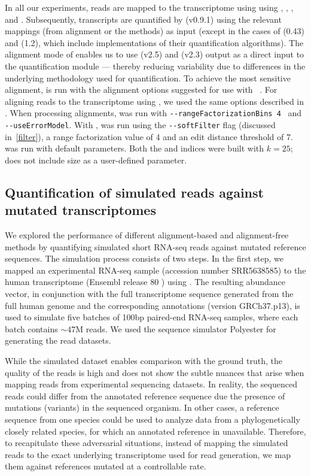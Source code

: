 In all our experiments, reads are mapped to the transcriptome using using \bt, \kallisto, \hera, \sla and \STAR. 
Subsequently, transcripts are quantified by \salmon(v0.9.1) using the relevant mappings (from alignment or the 
\nab methods) as input (except in the cases of \kallisto(0.43) and \hera(1.2), which include implementations of 
their quantification algorithms). The alignment mode of \salmon enables us to use \STAR(v2.5) and \bt(v2.3) output 
as a direct input to the quantification module --- thereby reducing variability due to differences in the 
underlying methodology used for quantification. To achieve the most sensitive alignment, \bt is run with the 
alignment options suggested for use with \rsem~\citep{rsembmc}. For aligning reads to the transcriptome using 
\STAR, we used the same options described in \citep{Srivastava2016rapmap}. When processing alignments, \salmon 
was run with \texttt{-{}-rangeFactorizationBins 4}~\citep{ismb2017factorization} and \texttt{-{}-useErrorModel}. 
With \sla, \salmon was run using the \texttt{-{}-softFilter} flag (discussed in~\ref{filter}), 
a range factorization value of 4 and an edit distance threshold of 7. \kallisto was run with default parameters. 
Both the \sla and \kallisto indices were built with $k=25$; \hera does not include \kmer size as a user-defined 
parameter.

\subsection{Quantification of simulated reads against mutated transcriptomes}\label{subsec:synthetic}

We explored the performance of different alignment-based and alignment-free methods by quantifying simulated short 
RNA-seq reads against mutated reference sequences. The simulation process consists of two steps. In the first step, 
we mapped an experimental RNA-seq sample (accession number SRR5638585) to the human transcriptome (Ensembl release 
80 \citep{yates2015ensembl} ) using \salmon. The resulting abundance vector, in conjunction with the full 
transcriptome sequence generated from the full human genome and the corresponding annotations (version GRCh37.p13), 
is used to simulate five batches of 100bp paired-end RNA-seq samples, where each batch contains $\sim47$M reads. 
We used the sequence simulator Polyester \citep{frazee2015polyester} for generating the read datasets.

While the simulated dataset enables comparison with the ground truth, the quality of the reads is high and does 
not show the subtle nuances that arise when mapping reads from experimental sequencing datasets. In reality, the 
sequenced reads could differ from the annotated reference sequence due the presence of mutations (variants) in the 
sequenced organism. In other cases, a reference sequence from one species could be used to analyze data from a 
phylogenetically closely related species, for which an annotated reference in unavailable. Therefore, to 
recapitulate these adversarial situations, instead of mapping the simulated reads to the exact underlying 
transcriptome used for read generation, we map them against references mutated at a controllable rate.

